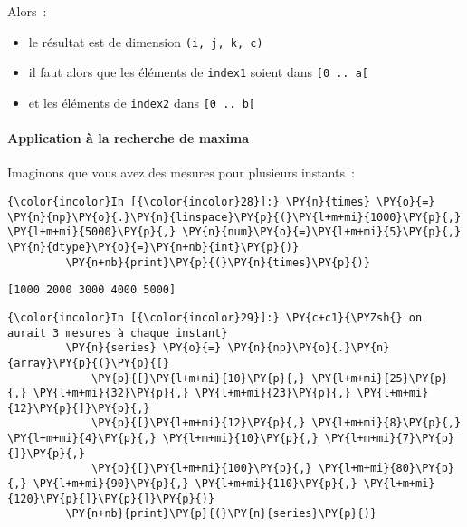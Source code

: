 Alors~:

\begin{itemize}
\tightlist
\item
  le résultat est de dimension \texttt{(i,\ j,\ k,\ c)}
\item
  il faut alors que les éléments de \texttt{index1} soient dans
  \texttt{{[}0\ ..\ a{[}}
\item
  et les éléments de \texttt{index2} dans \texttt{{[}0\ ..\ b{[}}
\end{itemize}

    \hypertarget{application-uxe0-la-recherche-de-maxima}{%
\paragraph{Application à la recherche de
maxima}\label{application-uxe0-la-recherche-de-maxima}}

    Imaginons que vous avez des mesures pour plusieurs instants~:

    \begin{Verbatim}[commandchars=\\\{\},frame=single,framerule=0.3mm,rulecolor=\color{cellframecolor}]
{\color{incolor}In [{\color{incolor}28}]:} \PY{n}{times} \PY{o}{=} \PY{n}{np}\PY{o}{.}\PY{n}{linspace}\PY{p}{(}\PY{l+m+mi}{1000}\PY{p}{,} \PY{l+m+mi}{5000}\PY{p}{,} \PY{n}{num}\PY{o}{=}\PY{l+m+mi}{5}\PY{p}{,} \PY{n}{dtype}\PY{o}{=}\PY{n+nb}{int}\PY{p}{)}
         \PY{n+nb}{print}\PY{p}{(}\PY{n}{times}\PY{p}{)}
\end{Verbatim}


    \begin{Verbatim}[commandchars=\\\{\},frame=single,framerule=0.3mm,rulecolor=\color{cellframecolor}]
[1000 2000 3000 4000 5000]
\end{Verbatim}

    \begin{Verbatim}[commandchars=\\\{\},frame=single,framerule=0.3mm,rulecolor=\color{cellframecolor}]
{\color{incolor}In [{\color{incolor}29}]:} \PY{c+c1}{\PYZsh{} on aurait 3 mesures à chaque instant}
         \PY{n}{series} \PY{o}{=} \PY{n}{np}\PY{o}{.}\PY{n}{array}\PY{p}{(}\PY{p}{[}
             \PY{p}{[}\PY{l+m+mi}{10}\PY{p}{,} \PY{l+m+mi}{25}\PY{p}{,} \PY{l+m+mi}{32}\PY{p}{,} \PY{l+m+mi}{23}\PY{p}{,} \PY{l+m+mi}{12}\PY{p}{]}\PY{p}{,}
             \PY{p}{[}\PY{l+m+mi}{12}\PY{p}{,} \PY{l+m+mi}{8}\PY{p}{,} \PY{l+m+mi}{4}\PY{p}{,} \PY{l+m+mi}{10}\PY{p}{,} \PY{l+m+mi}{7}\PY{p}{]}\PY{p}{,}
             \PY{p}{[}\PY{l+m+mi}{100}\PY{p}{,} \PY{l+m+mi}{80}\PY{p}{,} \PY{l+m+mi}{90}\PY{p}{,} \PY{l+m+mi}{110}\PY{p}{,} \PY{l+m+mi}{120}\PY{p}{]}\PY{p}{]}\PY{p}{)}
         \PY{n+nb}{print}\PY{p}{(}\PY{n}{series}\PY{p}{)}
\end{Verbatim}


